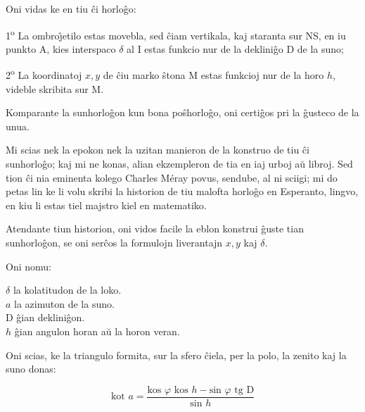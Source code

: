    Oni vidas ke en tiu \^ci horlo\^go:

1\textsuperscript{o} La ombro\^{\j}etilo estas movebla, sed \^ciam vertikala,
kaj staranta sur NS, en iu punkto A, kies interspaco $\delta$ al I
estas funkcio nur de la deklini\^go D de la suno;

2\textsuperscript{o} La koordinatoj $x, y$ de \^ciu marko \^stona M estas funkcioj nur de
la horo $h$, videble skribita sur M.

   Komparante la sunhorlo\^gon kun bona po\^shorlo\^go, oni certi\^gos pri
la \^gusteco de la unua.

   Mi scias nek la epokon nek la uzitan manieron de la konstruo de
tiu \^ci sunhorlo\^go; kaj mi ne konas, alian ekzempleron de tia en
iaj urboj a\u u libroj. Sed tion \^ci nia eminenta kolego Charles
Méray povus, sendube, al ni sciigi; mi do petas lin ke li volu
skribi la historion de tiu malofta horlo\^go en Esperanto, lingvo,
en kiu li estas tiel majstro kiel en matematiko.

   Atendante tiun historion, oni vidos facile la eblon konstrui \^guste
tian sunhorlo\^gon, se oni ser\^cos la formulojn liverantajn $x, y$
kaj $\delta$.

   Oni nomu:
   
{\newlength{\tempindent}
\setlength{\tempindent}{\parindent}
\setlength{\parindent}{0pt}   
\vspace{1ex}
\hspace*{\tempindent}$\delta$ la kolatitudon de la loko.\\
\hspace*{\tempindent}$a$ la azimuton de la suno.\\
\hspace*{\tempindent}D \^gian deklini\^gon.\\
\hspace*{\tempindent}$h$ \^gian angulon horan a\u u la horon veran.
\vspace{1ex}
}

   Oni scias, ke la triangulo formita, sur la sfero \^ciela, per la polo,
la zenito kaj la suno donas:

\begin{equation}
\text{kot } a  = \frac{\text{kos } \varphi \text{ kos } h - \text{sin } \varphi \text{ tg D} }{\text{sin } h}
\tag{1}
\end{equation}

